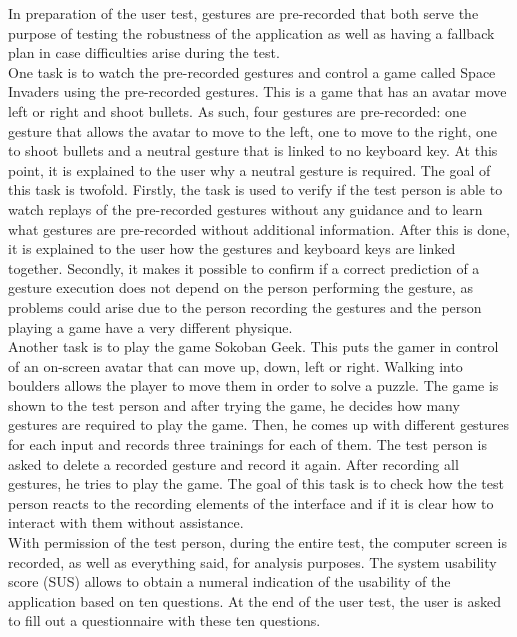 In preparation of the user test, gestures are pre-recorded that both serve the purpose of testing the robustness of the application as well as having a fallback plan in case difficulties arise during the test.\\

One task is to watch the pre-recorded gestures and control a game called Space Invaders using the pre-recorded gestures. This is a game that has an avatar move left or right and shoot bullets. As such, four gestures are pre-recorded: one gesture that allows the avatar to move to the left, one to move to the right, one to shoot bullets and a neutral gesture that is linked to no keyboard key. At this point, it is explained to the user why a neutral gesture is required. The goal of this task is twofold. Firstly, the task is used to verify if the test person is able to watch replays of the pre-recorded gestures without any guidance and to learn what gestures are pre-recorded without additional information. After this is done, it is explained to the user how the gestures and keyboard keys are linked together. Secondly, it makes it possible to confirm if a correct prediction of a gesture execution does not depend on the person performing the gesture, as problems could arise due to the person recording the gestures and the person playing a game have a very different physique.\\

Another task is to play the game Sokoban Geek. This puts the gamer in control of an on-screen avatar that can move up, down, left or right. Walking into boulders allows the player to move them in order to solve a puzzle. The game is shown to the test person and after trying the game, he decides how many gestures are required to play the game. Then, he comes up with different gestures for each input and records three trainings for each of them. The test person is asked to delete a recorded gesture and record it again. After recording all gestures, he tries to play the game. The goal of this task is to check how the test person reacts to the recording elements of the interface and if it is clear how to interact with them without assistance.\\

With permission of the test person, during the entire test, the computer screen is recorded, as well as everything said, for analysis purposes. The system usability score (SUS) allows to obtain a numeral indication of the usability of the application based on ten questions. At the end of the user test, the user is asked to fill out a questionnaire with these ten questions.


